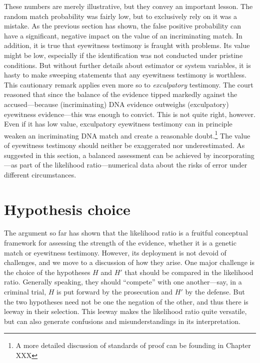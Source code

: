 \documentclass[
  10pt,
  dvipsnames,enabledeprecatedfontcommands]{scrartcl}
\begin{document}
These numbers are merely illustrative, but they convey an important
lesson. The random match probability was fairly low, but to exclusively
rely on it was a mistake. As the previous section has shown, the false
positive probability can have a significant, negative impact on the
value of an incriminating match. In addition, it is true that eyewitness
testimony is fraught with problems. Its value might be low, especially
if the identification was not conducted under pristine conditions. But
without further details about estimator or system variables, it is hasty
to make sweeping statements that any eyewitness testimony is worthless.
This cautionary remark applies even more so to \textit{exculpatory}
testimony. The court reasoned that since the balance of the evidence
tipped markedly against the accused---because (incriminating) DNA
evidence outweighs (exculpatory) eyewitness evidence---this was enough
to convict. This is not quite right, however. Even if it has low value,
exculpatory eyewitness testimony can in principle weaken an
incriminating DNA match and create a reasonable doubt.\footnote{A more
  detailed discussion of standards of proof can be founding in Chapter
  XXX} The value of eyewitness testimony should neither be exaggerated
nor underestimated. As suggested in this section, a balanced assessment
can be achieved by incorporating---as part of the likelihood
ratio---numerical data about the risks of error under different
circumstances. 

\hypertarget{hypothesis-choice}{%
\section{\texorpdfstring{Hypothesis choice
\label{sec:hchoice}}{Hypothesis choice }}\label{hypothesis-choice}}

The argument so far has shown that the likelihood ratio is a fruitful
conceptual framework for assessing the strength of the evidence, whether
it is a genetic match or eyewitness testimony. However, its deployment
is not devoid of challenges, and we move to a discussion of how they
arise. One major challenge is the choice of the hypotheses \(H\) and
\(H'\) that should be compared in the likelihood ratio. Generally
speaking, they should ``compete'' with one another---say, in a criminal
trial, \(H\) is put forward by the prosecution and \(H'\) by the
defense. But the two hypotheses need not be one the negation of the
other, and thus there is leeway in their selection. This leeway makes
the likelihood ratio quite versatile, but can also generate confusions
and misunderstandings in its interpretation.
\end{document}
